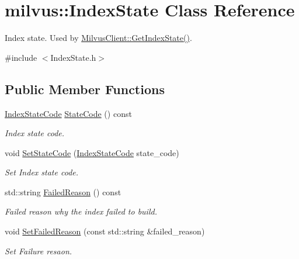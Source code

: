 \hypertarget{classmilvus_1_1_index_state}{}\section{milvus\+:\+:Index\+State Class Reference}
\label{classmilvus_1_1_index_state}


Index state. Used by \hyperlink{classmilvus_1_1_milvus_client_ad4abd1fc1153cd777a5080aa2ad8ca2b}{Milvus\+Client\+::\+Get\+Index\+State()}.  




{\ttfamily \#include $<$Index\+State.\+h$>$}

\subsection*{Public Member Functions}
\begin{DoxyCompactItemize}
\item 
\mbox{\label{classmilvus_1_1_index_state_acd55bc5ccbf87a8fb7e27ebdd13466ef}} 
\hyperlink{namespacemilvus_a41d88e00964bea51a391cff73f2cb256}{Index\+State\+Code} \hyperlink{classmilvus_1_1_index_state_acd55bc5ccbf87a8fb7e27ebdd13466ef}{State\+Code} () const
\begin{DoxyCompactList}\small\item\em Index state code. \end{DoxyCompactList}\item 
\mbox{\label{classmilvus_1_1_index_state_a95c62425943b3a0e40ab4d7fc17672b7}} 
void \hyperlink{classmilvus_1_1_index_state_a95c62425943b3a0e40ab4d7fc17672b7}{Set\+State\+Code} (\hyperlink{namespacemilvus_a41d88e00964bea51a391cff73f2cb256}{Index\+State\+Code} state\+\_\+code)
\begin{DoxyCompactList}\small\item\em Set Index state code. \end{DoxyCompactList}\item 
\mbox{\label{classmilvus_1_1_index_state_abf4934ba8a71060416890475f844dcfd}} 
std\+::string \hyperlink{classmilvus_1_1_index_state_abf4934ba8a71060416890475f844dcfd}{Failed\+Reason} () const
\begin{DoxyCompactList}\small\item\em Failed reason why the index failed to build. \end{DoxyCompactList}\item 
\mbox{\label{classmilvus_1_1_index_state_a782acf80ae6bf4d4e782d447dbe7442a}} 
void \hyperlink{classmilvus_1_1_index_state_a782acf80ae6bf4d4e782d447dbe7442a}{Set\+Failed\+Reason} (const std\+::string \&failed\+\_\+reason)
\begin{DoxyCompactList}\small\item\em Set Failure resaon. \end{DoxyCompactList}\end{DoxyCompactItemize}


